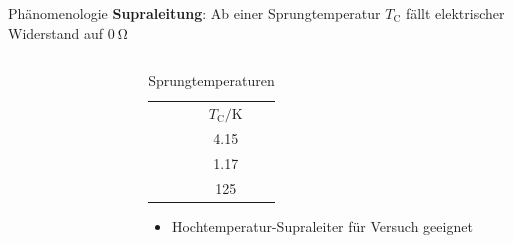 
\begin{frame}{Phänomenologie}
\textbf{Supraleitung}: Ab einer Sprungtemperatur $T_{\mathup{C}}$ fällt elektrischer Widerstand auf $\SI{0}{\ohm}$ \\
\begin{columns}
\begin{column}{0.49\textwidth}
  \begin{figure}
    \label{fig: hg_supraleitung}
  \end{figure}
\end{column}
\begin{column}{0.49\textwidth}

\begin{table}
  \caption{Sprungtemperaturen \cite{dem2}}
  \label{tab: sprungtemperaturen}
\begin{tabular}{l S}
  & $T_{\mathup{C}} / \si{\kelvin}$ \\
   & \num{4.15} \\
     & \num{1.17} \\
       & \num{125}
\end{tabular}
\end{table}
\pause
\begin{itemize}
  \item Hochtemperatur-Supraleiter für Versuch geeignet
\end{itemize}

\end{column}
\end{columns}
\end{frame}


